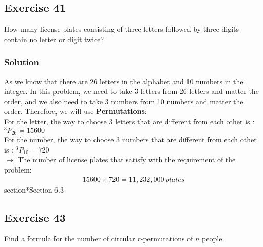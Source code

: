 \documentclass{article}
\theoremstyle{mytheoremstyle}
\theoremstyle{mytheoremstyle}
\theoremstyle{myproblemstyle}
\begin{document}
    \subsection*{Exercise 41}
    How many license plates consisting of three letters followed by three digits contain no letter or digit twice?
    \subsubsection*{Solution}
    As we know that there are 26 letters in the alphabet and 10 numbers in the integer.
    In this problem, we need to take 3 letters from 26 letters and matter the order, and we 
    also need to take 3 numbers from 10 numbers and matter the order. Therefore, we will use
    \textbf{Permutations}:\\
    
    For the letter, the way to choose 3 letters that are different from each other is : $ ^3P_{26} = 15600 $\\

    For the number, the way to choose 3 numbers that are different from each other is : $ ^3P_{10} = 720 $\\

    $ \rightarrow $ The number of license plates that satisfy with the requirement of the problem:
    \begin{align*}
        15600 \times 720 = 11,232,000 \ plates
    \end{align*}
    section*{Section 6.3}
    \subsection*{Exercise 43}
    Find a formula for the number of circular \(r\)-permutations of \(n\) people.
\end{document}
